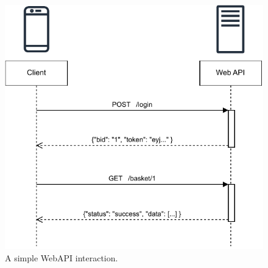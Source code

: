 \begin{figure}[!htp]
    \center
    \includegraphics[width=0.9\columnwidth]{figures/SimpleJuiceShop.drawio.pdf}
    \caption{A simple WebAPI interaction.}
    \label{fig:simplesWebAPIJuiceShop}
\end{figure}

